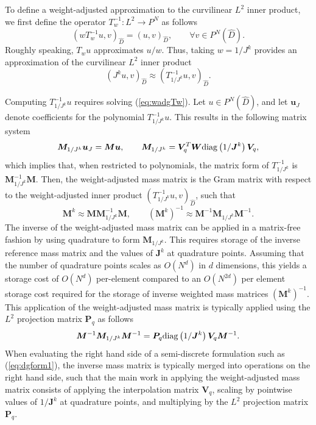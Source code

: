 \documentclass[preprint,10pt]{article}
\theoremstyle{definition}
\theoremstyle{lemma}
\theoremstyle{theorem}
\theoremstyle{assumption}
\renewcommand{\hat}{\widehat}
\newcommand{\LRp}[1]{\left( #1 \right)}
\newcommand{\diag}[1]{{\rm diag}\LRp{#1}}
\begin{document}
{To define a weight-adjusted approximation to the curvilinear $L^2$ inner product, we first define the operator $T_{w}^{-1}: L^2\rightarrow P^N$ as follows
\begin{equation}
  \LRp{wT_{w}^{-1} u,v}_{\hat{D}} = \LRp{ u,v}_{\hat{D}}, \qquad \forall v\in P^N\LRp{\hat{D}}.
\label{eq:wadgTw}
\end{equation}
Roughly speaking, $T_{w} u$ approximates $u/w$.  Thus, taking $w = 1/J^k$ provides an approximation of the curvilinear $L^2$ inner product
\begin{equation*}
\LRp{J^k u,v}_{\hat{D}} \approx \LRp{T_{1/J^k}^{-1} u,v}_{\hat{D}}.
\end{equation*}

Computing $T_{1/J^k}^{-1}u$ requires solving (\ref{eq:wadgTw}).  Let $u \in P^N\LRp{\hat{D}}$, and let $\bm{u}_J$ denote coefficients for the polynomial $T_{1/J^k}^{-1}u$.  This results in the following matrix system
\[
\bm{M}_{1/J^k}\bm{u}_{J} = \bm{M}\bm{u}, \qquad {\bm{M}_{1/J^k}} = \bm{V}_q^T \bm{W}\diag{1/\bm{J}^k}\bm{V}_q,%
\]
which implies that, when restricted to polynomials, the matrix form of $T_{1/J^k}^{-1}$ is $\bm{M}_{1/J^k}^{-1}\bm{M}$.  Then, the weight-adjusted mass matrix is the Gram matrix with respect to the weight-adjusted inner product $\LRp{T_{1/J^k}^{-1} u,v}_{\hat{D}}$, such that
\[
\bm{M}^k \approx \bm{M}\bm{M}_{1/J^k}^{-1}\bm{M}, \qquad \LRp{\bm{M}^k}^{-1} \approx \bm{M}^{-1}\bm{M}_{1/J^k}\bm{M}^{-1}.
\]
The inverse of the weight-adjusted mass matrix can be applied in a matrix-free fashion by using quadrature to form $\bm{M}_{1/J^k} $.  This requires storage of the inverse reference mass matrix and the values of $\bm{J}^k$ at quadrature points.  Assuming that the number of quadrature points scales as $O(N^d)$ in $d$ dimensions, this yields a storage cost of $O(N^d)$ per-element compared to an $O(N^{2d})$ per element storage cost required for the storage of inverse weighted mass matrices $\LRp{\bm{M}^k}^{-1}$.  This application of the weight-adjusted mass matrix is typically applied using the $L^2$ projection matrix $\bm{P}_q$ as follows
\[
\bm{M}^{-1}\bm{M}_{1/J^k}\bm{M}^{-1} = \bm{P}_q \diag{1/\bm{J}^k} \bm{V}_q \bm{M}^{-1}.
\]
When evaluating the right hand side of a semi-discrete formulation such as (\ref{eq:dgform1}), the inverse mass matrix is typically merged into operations on the right hand side, such that the main work in applying the weight-adjusted mass matrix consists of applying the interpolation matrix $\bm{V}_q$, scaling by pointwise values of $1/\bm{J}^k$ at quadrature points, and multiplying by the $L^2$ projection matrix $\bm{P}_q$.


}
\end{document}
